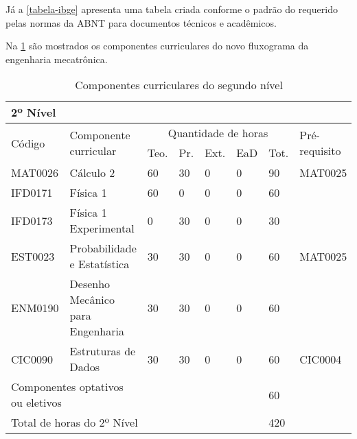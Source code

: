 Já a \cref{tabela-ibge} apresenta uma tabela criada conforme o padrão do  requerido pelas normas da ABNT para documentos técnicos e acadêmicos.

\begin{table}[htb]
\end{table}

Na \cref{tab:lvlii} são mostrados os componentes curriculares do novo fluxograma da engenharia mecatrônica.

\begin{table}[htb]
\small
\begin{center}%
\caption{Componentes curriculares do segundo nível} \label{tab:lvlii}
\noindent%
\begin{tabular}{|m{1.5cm}|m{4.3cm}|m{.7cm}|m{.7cm}|m{.7cm}|m{.7cm}|m{.7cm}|m{2.1cm}|}
\hline%
\multicolumn{8}{|l|}{\textbf{2º Nível}} \\\hline%
\multirow{2}{*}{Código} &
\multirow{2}{*}{Componente curricular} &
\multicolumn{5}{c|}{Quantidade de horas} & 
\multirow{2}{*}{Pré-requisito} \\ 
\cline{3-7} & & Teo. & Pr. & Ext. & EaD & Tot. & \\\hline\hline%
MAT0026 & Cálculo 2 & 60 & 30 & 0 & 0 & 90 & MAT0025 \\\hline%
IFD0171 & Física 1 & 60 & 0 & 0 & 0 & 60 & \\\hline%
IFD0173 & Física 1 Experimental & 0 & 30 & 0 & 0 & 30 & \\\hline%
EST0023 & Probabilidade e Estatística & 30 & 30 & 0 & 0 & 60 & MAT0025 \\\hline%
ENM0190 & Desenho Mecânico para Engenharia & 30 & 30 & 0 & 0 & 60 & \\\hline%
CIC0090 & Estruturas de Dados & 30 & 30 & 0 & 0 & 60 & CIC0004 \\\hline%
\multicolumn{2}{|l|}{Componentes optativos ou eletivos} & & & & & 60 & \multicolumn{1}{r}{} \\\cline{1-7}%
\multicolumn{6}{|l|}{Total de horas do 2º Nível} & 420 & \multicolumn{1}{r}{} \\\cline{1-7}%
\end{tabular}
\end{center}%
\end{table}

